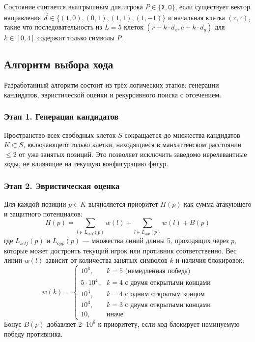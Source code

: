 \documentclass[12pt,a4paper]{article}
\begin{document}
Состояние считается выигрышным для игрока $P \in \{\texttt{X}, \texttt{O}\}$, если существует вектор направления $\vec{d} \in \{(1,0), (0,1), (1,1), (1,-1)\}$ и начальная клетка $(r,c)$, такие что последовательность из $L=5$ клеток $(r + k \cdot d_x, c + k \cdot d_y)$ для $k \in [0, 4]$ содержит только символы $P$.

\subsection{Алгоритм выбора хода}
Разработанный алгоритм состоит из трёх логических этапов: генерации кандидатов, эвристической оценки и рекурсивного поиска с отсечением.

\subsubsection*{Этап 1. Генерация кандидатов}
Пространство всех свободных клеток $S$ сокращается до множества кандидатов $K \subset S$, включающего только клетки, находящиеся в манхэттенском расстоянии $\leq 2$ от уже занятых позиций. Это позволяет исключить заведомо нерелевантные ходы, не влияющие на текущую конфигурацию фигур.

\subsubsection*{Этап 2. Эвристическая оценка}
Для каждой позиции $p \in K$ вычисляется приоритет $H(p)$ как сумма атакующего и защитного потенциалов:
\[
H(p) = \sum_{l \in L_{self}(p)} w(l) + \sum_{l \in L_{opp}(p)} w(l) + B(p)
\]
где $L_{self}(p)$ и $L_{opp}(p)$ — множества линий длины 5, проходящих через $p$, которые может достроить текущий игрок или противник соответственно. Вес линии $w(l)$ зависит от количества занятых символов $k$ и наличия блокировок:
\[
w(k) = \begin{cases}
10^6, & k=5 \text{ (немедленная победа)} \\
5 \cdot 10^4, & k=4 \text{ с двумя открытыми концами} \\
10^4, & k=4 \text{ с одним открытым концом} \\
10^3, & k=3 \text{ с двумя открытыми концами} \\
10, & \text{иначе}
\end{cases}
\]
Бонус $B(p)$ добавляет $2 \cdot 10^6$ к приоритету, если ход блокирует неминуемую победу противника.
\end{document}
